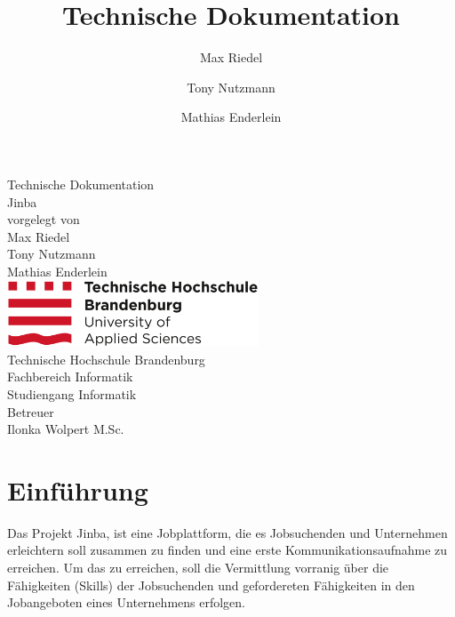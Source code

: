 \documentclass[12pt, letterpaper]{article}
\title{Technische Dokumentation}
\author{Max Riedel \and Tony Nutzmann \and Mathias Enderlein}
\begin{document}
    \begin{titlepage}
        \clearpage
        \begin{center}
        {\Large Technische Dokumentation}\\[3mm]
        {\Huge Jinba}\\[20mm]

        {vorgelegt von}\\[2mm]
        {\large Max Riedel}\\[2mm]
        {\large Tony Nutzmann}\\[2mm]
        {\large Mathias Enderlein}\\[50mm]

        \includegraphics[width=75mm]{img/Technische_Hochschule_Brandenburg_Logo.svg.png}\\[10mm]

        {Technische Hochschule Brandenburg}\\[2mm]

        {Fachbereich Informatik}\\[2mm]

        {Studiengang Informatik}\\[20mm]

        {Betreuer \\[2mm] Ilonka Wolpert M.Sc.}
        \end{center}

        \thispagestyle{empty}
    \end{titlepage}

    \begin{versionhistory}
    \end{versionhistory}
    \newpage
    \tableofcontents
    \newpage
    \section{Einführung}

    Das Projekt Jinba, ist eine Jobplattform, die es Jobsuchenden und Unternehmen
    erleichtern soll zusammen zu finden und eine erste Kommunikationsaufnahme zu erreichen.
    Um das zu erreichen, soll die Vermittlung vorranig über die Fähigkeiten (Skills) der Jobsuchenden
    und gefordereten Fähigkeiten in den Jobangeboten eines Unternehmens erfolgen.
\end{document}

